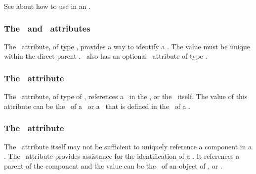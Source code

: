 See  about how to use \SpeciesTypeComponentIndex in an \outwardBindingSite.

\label{def:SpeciesTypeComponentIndexNote}

\subsubsection{The \idAtt\ and \nameAtt\ attributes}
\label{def:SpeciesTypeComponentIndex:id}

The \idAtt\ attribute, of type \SIdPT, provides a way to identify a \speciesTypeComponentIndex. The value must be unique within the direct parent \speciesType. \SpeciesTypeComponentIndex\ also has an optional \nameAtt\ attribute of type \stringPT.

\subsubsection{The \componentAtt\ attribute}
\label{def:SpeciesTypeComponentIndex:component}

The \componentAtt\ attribute, of type of \SIdRefPT, references a \speciesTypeInstance\ in the \speciesType, or the \speciesType\ itself. The value of this attribute can be the \idAtt\ of a \speciesTypeInstance\ or a \speciesTypeComponentIndex\ that is defined in the \speciesType\ of a \speciesTypeInstance. 

\subsubsection{The \identifyingParentAtt\ attribute}
\label{def:SpeciesTypeComponentIndex:identifyingParent}

The \componentAtt\ attribute itself may not be sufficient to uniquely reference a component in a \speciesType. The \identifyingParentAtt\ attribute provides assistance for the identification of a \componentWR. It references a parent of the component and the value can be the \idAtt\ of an object of \SpeciesTypeInstance, \SpeciesTypeComponentIndex or \SpeciesType.

